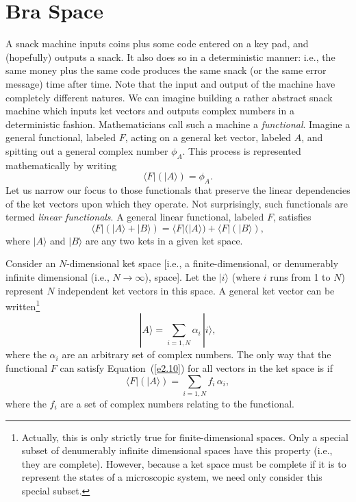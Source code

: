 \section{Bra Space}
 A snack machine inputs coins plus some code entered on a key pad, and
(hopefully) outputs a snack. It also does so in a deterministic manner: {\rm i.e.},
the same money plus the same code produces the same snack 
(or the same error message) time after time.
Note that the input and output of the machine have completely different natures. 
We can imagine building a rather abstract snack machine which inputs ket
vectors and outputs  complex numbers in a deterministic fashion. Mathematicians
call such a machine a {\em functional}. Imagine a general functional, labeled
$F$, acting on a general ket vector, labeled $A$, and spitting out a general
complex number $\phi_A$. This  process is represented mathematically by writing
\begin{equation}
\langle F|(|A\rangle) = \phi_A.
\end{equation}
Let us narrow our focus to those functionals that preserve the linear dependencies
of the ket vectors upon which they operate. Not surprisingly, such functionals
are termed {\em linear functionals}. A general linear functional, labeled $F$,
satisfies
\begin{equation}\label{e2.10}
\langle F|(|A\rangle + |B\rangle) = \langle F|(|A\rangle) +
 \langle F|(|B \rangle),
\end{equation}
where $|A\rangle$ and $|B\rangle$ are any two kets in a given ket space.

Consider an $N$-dimensional ket space [{\rm i.e.}, a finite-dimensional, or
denumerably infinite dimensional ({\rm i.e.}, $N\rightarrow\infty$),  space].
Let the $|i\rangle$ (where $i$ runs from 1 to $N$) 
represent $N$ independent ket vectors in this space. 
A general ket vector can be written\footnote{Actually, this is only 
strictly true for finite-dimensional spaces. Only a special subset
of denumerably infinite dimensional spaces have this property ({\rm i.e.}, they
are complete). However, because  a ket space must be complete if it is
to represent the states of a microscopic system, we need only consider
this special subset.}
\begin{equation}\label{e2.11}
|A\rangle = \sum_{i=1,N} \alpha_i \,|i\rangle,
\end{equation}
where the $\alpha_i$ are an arbitrary set of complex numbers.
The only way that the functional $F$ can satisfy Equation~(\ref{e2.10}) for all vectors in the ket
space is if
\begin{equation}\label{e2.12}
\langle F|(|A\rangle) = \sum_{i=1,N} f_i \,\alpha_i,
\end{equation}
where the $f_i$ are a set of complex numbers relating to the functional.

